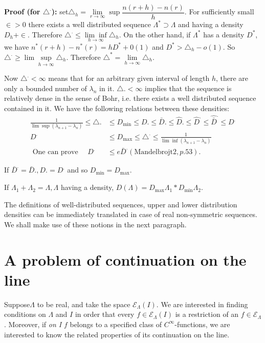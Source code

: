 \noindent \textbf{Proof (for $\triangle^.$):} %
 set\pageoriginale $\triangle_h = \lim\limits_{r \to
 \infty} \sup \dfrac{n (r+h) - n(r)}{h}$. For sufficiently small
 $\in > 0$ there exists a well distributed sequence $\Lambda^*
 \supset \Lambda$ and having a density $D_h + \in $. Therefore
 $\triangle^. \le \underset{h \to \infty}{\lim \inf} \triangle_h$. On
 the other hand, if $\Lambda^*$ has a density $D^*$, we have $n^*(r +
 h) - n^* (r) = h D^* + 0(1)$ and $D^* > \triangle_h - o(1)$. So
 $\triangle^. \ge \lim \sup\limits_{h \to \infty}
 \triangle_h$. Therefore $\triangle^* = \lim\limits_{h \to \infty}
 \triangle_h$. 

Now $\triangle^. < \infty$ means that for an arbitrary given interval
of length $h$, there are only a bounded number of $\lambda_n$ in
it. $\triangle. < \infty$ implies that the sequence is relatively
dense in the sense of Bohr, i.e. there exists a well distributed
sequence contained in it. We have the following relations between
these densities: 
\begin{align*}
 \frac{1}{\lim \sup (\lambda_{n + 1} - \lambda_n)} \le \triangle. &
 \le D_{\min} \le D. \le \bar{D}. \le \hat{D}. \le \hat{D}^. \le
 \hat{\bar{D}}^. \le D^.\\ 
 D^. & \le D_{\max} \le \triangle^. \le \frac{1}{\lim \inf
 (\lambda_{n + 1} - \lambda_n)}\\ 
 \text { One can prove } \quad D^. & \le e \bar{D}^. (\text
    {Mandelbrojt} 2, p. 53). 
\end{align*}

If $\bar{D}^. = \bar{D}., D.= D^.$ and so $D_{\min} = D_{\max}$.

If $\Lambda_1 + \Lambda_2 = \Lambda, \Lambda$ having a density,
$D(\Lambda) = D_{\max} \Lambda_1 * D_{\min} \Lambda_2$. 

The definitions of well-distributed sequences, upper and lower
distribution densities can be immediately translated in case of real
non-symmetric sequences. We shall make use of these notions in the
next paragraph. 

\section{A problem of continuation on the line}\label{chap17:sec2}%

Suppose\pageoriginale $\Lambda$ to be real, and take the space $\mathscr{E}_\Lambda
(I)$. We are interested in finding conditions on $\Lambda$ and $I$ in
order that every $f \in \mathscr{E}_\Lambda (I)$ is a
restriction of an $f \in \mathscr{E}_\Lambda$. Moreover, if
\textit{on I} $ f $ belongs to a specified class of
$C^\infty$-functions, we are interested to know the related properties
of its continuation on the line. 

